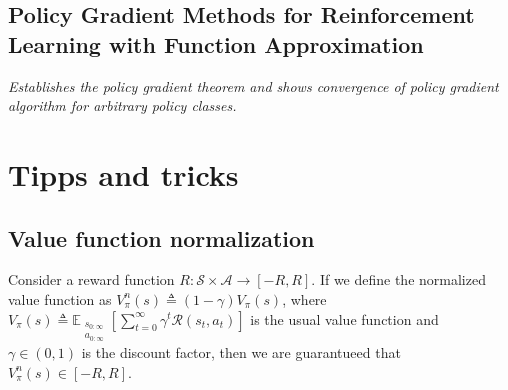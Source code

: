 \documentclass[a4paper, fontsize=8pt, landscape, DIV=1]{scrartcl}
\begin{document}
\begin{multicols*}{3}
\subsection{Policy Gradient Methods for Reinforcement Learning with Function Approximation}
\textit{Establishes the policy gradient theorem and shows convergence of policy gradient algorithm for arbitrary policy classes.}\\[5pt]

\section{Tipps and tricks}
\subsection{Value function normalization}
Consider a reward function $R:\mathcal{S}\times\mathcal{A}\rightarrow[-R,R]$. If we define the normalized value function as $V_{\pi}^n(s)\triangleq(1-\gamma)V_{\pi}(s)$, where $V_{\pi}(s)\triangleq\mathbb{E}_{\substack{s_{0:\infty}\\a_{0:\infty}}}[\sum\limits_{t=0}^{\infty}\gamma^t\mathcal{R}(s_t,a_t)]$ is the usual value function and $\gamma\in(0,1)$ is the discount factor, then we are guarantueed that $V_{\pi}^n(s)\in[-R,R]$.





\end{multicols*}


\setcounter{secnumdepth}{2}
\end{document}
